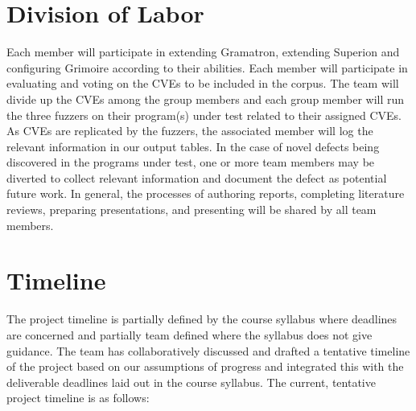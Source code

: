 \documentclass[12pt]{diazessay}
\begin{document}
\section*{Division of Labor}

Each member will participate in extending Gramatron, extending Superion and configuring Grimoire according to their abilities.
Each member will participate in evaluating and voting on the CVEs to be included in the corpus.
The team will divide up the CVEs among the group members and each group member will run the three fuzzers on their program(s) under test related to their assigned CVEs. 
As CVEs are replicated by the fuzzers, the associated member will log the relevant information in our output tables.
In the case of novel defects being discovered in the programs under test, one or more team members may be diverted to collect relevant information and document the defect as potential future work.
In general, the processes of authoring reports, completing literature reviews, preparing presentations, and presenting will be shared by all team members.

\clearpage
\section*{Timeline}

The project timeline is partially defined by the course syllabus where deadlines are concerned and partially team defined where the syllabus does not give guidance.
The team has collaboratively discussed and drafted a tentative timeline of the project based on our assumptions of progress and integrated this with the deliverable deadlines laid out in the course syllabus. The current, tentative project timeline is as follows:
\end{document}
